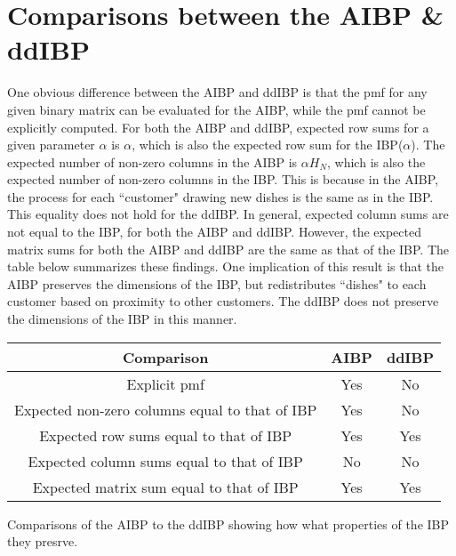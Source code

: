 \section{Comparisons between the AIBP \& ddIBP}
One obvious difference between the AIBP and ddIBP is that the pmf for any given
binary matrix can be evaluated for the AIBP, while the pmf cannot be explicitly
computed. For both the AIBP and ddIBP, expected row sums for a given parameter
$\alpha$ is $\alpha$, which is also the expected row sum for the IBP($\alpha$).
The expected number of non-zero columns in the AIBP is $\alpha H_N$, which is
also the expected number of non-zero columns in the IBP. This is because in the
AIBP, the process for each ``customer" drawing new dishes is the same as in the
IBP. This equality does not hold for the ddIBP. In general, expected column
sums are not equal to the IBP, for both the AIBP and ddIBP. However, the
expected matrix sums for both the AIBP and ddIBP are the same as that of the
IBP. The table below summarizes these findings. One implication of this result
is that the AIBP preserves the dimensions of the IBP, but redistributes
``dishes" to each customer based on proximity to other customers. The ddIBP
does not preserve the dimensions of the IBP in this manner. \\

\begin{center}
  \begin{tabular}{c|c|c}
    \hline
      Comparison & AIBP & ddIBP \\ \hline \hline
      Explicit pmf & Yes & No \\ \hline
      Expected non-zero columns equal to that of IBP & Yes & No \\ \hline
      Expected row sums equal to that of IBP & Yes & Yes \\ \hline
      Expected column sums equal to that of IBP & No & No \\ \hline
      Expected matrix sum equal to that of IBP & Yes & Yes \\ \hline
    \hline
  \end{tabular}
   {Comparisons of the AIBP to the ddIBP showing how what 
                     properties of the IBP they presrve.}
\end{center}

